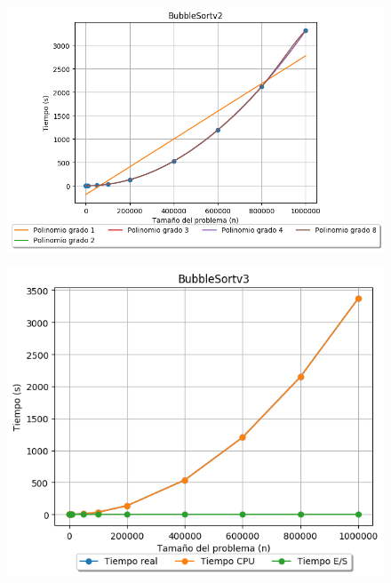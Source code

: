 \documentclass[12pt, fleqn]{report}                             %
\theoremstyle{break}                                            %
\begin{document}
    	        \begin{figure}[H]
    	            \centering
    	            \includegraphics[scale=0.9]{graphics/BubbleSortv2-Polynomials.png}
    	        \end{figure}
    	        
    	        \begin{figure}[H]
    	            \centering
    	            \includegraphics[scale=0.9]{graphics/BubbleSortv3-ExperimentalTimes.png}
    	        \end{figure}
    	        
\end{document}

